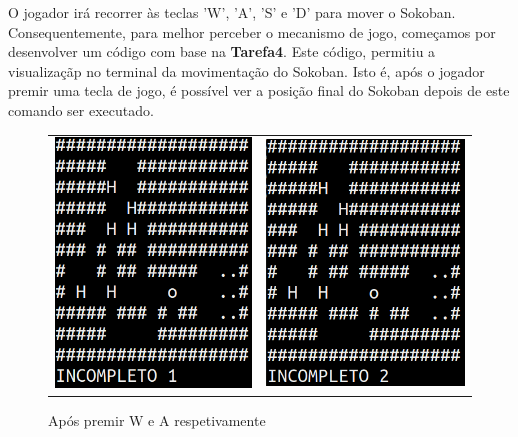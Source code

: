 \documentclass[12pt,a4paper]{report}
\begin{document}
O jogador irá recorrer às teclas 'W', 'A', 'S' e 'D' para mover o Sokoban.
Consequentemente, para melhor perceber o mecanismo de jogo, começamos por desenvolver um código com base na \textbf{Tarefa4}. Este código, permitiu a visualizaçãp no terminal da movimentação do Sokoban. Isto é, após o jogador premir uma tecla de jogo, é possível ver a posição final do Sokoban depois de este comando ser executado.\\

\begin{figure}[htb]
\centering
  \begin{tabular}{@{}cc@{}}
    \includegraphics[scale=0.42]{images/Capturar1.PNG} &
    \includegraphics[scale=0.42]{images/Capturar2.PNG}
  \end{tabular}
  \caption{Após premir W e A respetivamente}
\end{figure}
\end{document}
